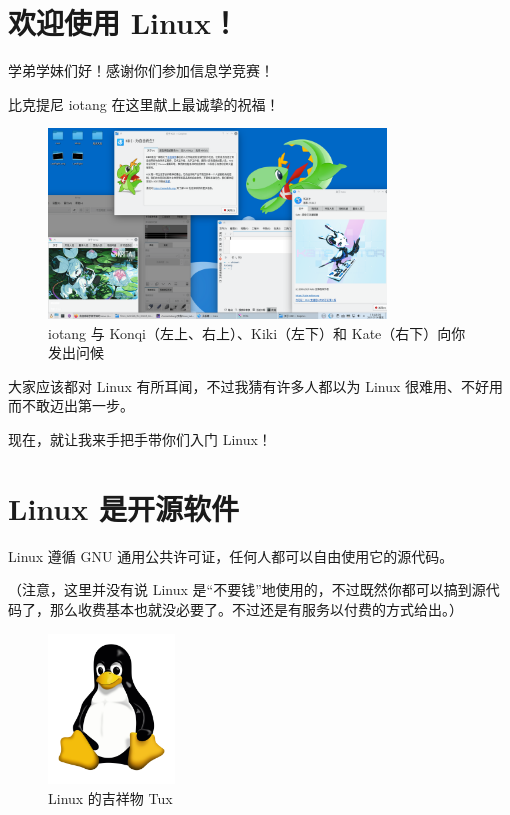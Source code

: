 \documentclass[UTF-8]{ctexart}
\begin{document}
	\newpage
	
	\tableofcontents

	\newpage

	\section{欢迎使用 Linux！}
	
		学弟学妹们好！感谢你们参加信息学竞赛！
		
		比克提尼 iotang 在这里献上最诚挚的祝福！
			
		\begin{figure}[H]
			\centering
			\includegraphics[width=0.8\textwidth]{fig/iotangsdesktop.png}
			\caption*{iotang 与 Konqi（左上、右上）、Kiki（左下）和 Kate（右下）向你发出问候}
		\end{figure}
	
		大家应该都对 Linux 有所耳闻，不过我猜有许多人都以为 Linux 很难用、不好用而不敢迈出第一步。
		
		现在，就让我来手把手带你们入门 Linux！
		
	\newpage
	
	\section{Linux 是开源软件}
	
		Linux 遵循 GNU 通用公共许可证，任何人都可以自由使用它的源代码。
		
		（注意，这里并没有说 Linux 是“不要钱”地使用的，不过既然你都可以搞到源代码了，那么收费基本也就没必要了。不过还是有服务以付费的方式给出。）
		
		\begin{figure}[H]
			\centering
			\includegraphics[width=0.3\textwidth]{fig/tux.png}
			\caption*{Linux 的吉祥物 Tux}
		\end{figure}
		
\end{document}
